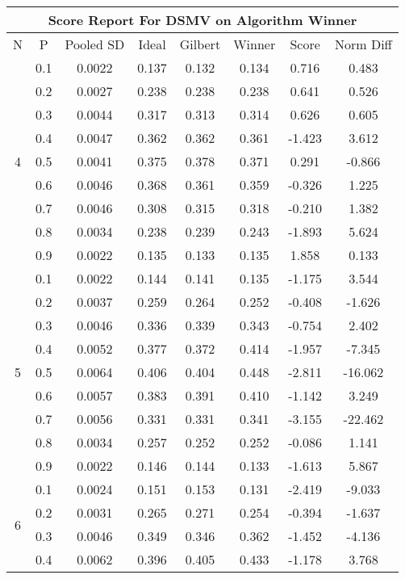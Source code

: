 \documentclass[11pt,a4paper]{report}
\begin{document}
\begin{longtable}{ | c | c || c | c | c | c | c | c | }
\hline
\multicolumn{8}{|c|}{ Score Report For DSMV on Algorithm Winner} \\
\hline
N & P & Pooled SD &  Ideal &  Gilbert & Winner  & Score & Norm Diff \\
 \hline
 \hline
 \endhead
\multirow{9}{*}{4} & 0.1 & 0.0022 & 0.137 & 0.132 & 0.134 & 0.716 & 0.483 \\
 & 0.2 & 0.0027 & 0.238 & 0.238 & 0.238 & 0.641 & 0.526 \\
 & 0.3 & 0.0044 & 0.317 & 0.313 & 0.314 & 0.626 & 0.605 \\
 & 0.4 & 0.0047 & 0.362 & 0.362 & 0.361 & -1.423 & 3.612 \\
 & 0.5 & 0.0041 & 0.375 & 0.378 & 0.371 & 0.291 & -0.866 \\
 & 0.6 & 0.0046 & 0.368 & 0.361 & 0.359 & -0.326 & 1.225 \\
 & 0.7 & 0.0046 & 0.308 & 0.315 & 0.318 & -0.210 & 1.382 \\
 & 0.8 & 0.0034 & 0.238 & 0.239 & 0.243 & -1.893 & 5.624 \\
 & 0.9 & 0.0022 & 0.135 & 0.133 & 0.135 & 1.858 & 0.133 \\
 \hline
\multirow{9}{*}{5} & 0.1 & 0.0022 & 0.144 & 0.141 & 0.135 & -1.175 & 3.544 \\
 & 0.2 & 0.0037 & 0.259 & 0.264 & 0.252 & -0.408 & -1.626 \\
 & 0.3 & 0.0046 & 0.336 & 0.339 & 0.343 & -0.754 & 2.402 \\
 & 0.4 & 0.0052 & 0.377 & 0.372 & 0.414 & -1.957 & -7.345 \\
 & 0.5 & 0.0064 & 0.406 & 0.404 & 0.448 & -2.811 & -16.062 \\
 & 0.6 & 0.0057 & 0.383 & 0.391 & 0.410 & -1.142 & 3.249 \\
 & 0.7 & 0.0056 & 0.331 & 0.331 & 0.341 & -3.155 & -22.462 \\
 & 0.8 & 0.0034 & 0.257 & 0.252 & 0.252 & -0.086 & 1.141 \\
 & 0.9 & 0.0022 & 0.146 & 0.144 & 0.133 & -1.613 & 5.867 \\
 \hline
\multirow{9}{*}{6} & 0.1 & 0.0024 & 0.151 & 0.153 & 0.131 & -2.419 & -9.033 \\
 & 0.2 & 0.0031 & 0.265 & 0.271 & 0.254 & -0.394 & -1.637 \\
 & 0.3 & 0.0046 & 0.349 & 0.346 & 0.362 & -1.452 & -4.136 \\
 & 0.4 & 0.0062 & 0.396 & 0.405 & 0.433 & -1.178 & 3.768 \\

\end{longtable}
\end{document}
